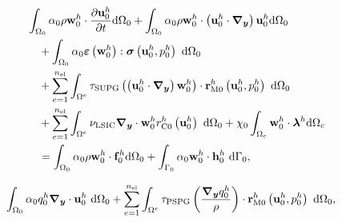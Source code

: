 \documentclass[tese_patricia]{subfiles}
\begin{document}
\begin{align}
	\begin{split}
		&\int_{\globalModel} \arlequinWFGlobal \density \wglobalh \cdot \frac{\partial\uglobalh}{\partial t} \deriv \globalModel +
		\int_{\globalModel} \arlequinWFGlobal \density \wglobalh \cdot  \left(\uglobalh \cdot \gradient \right) \uglobalh \deriv \globalModel  \\ 
		&\quad+	
		\int_{\globalModel} \arlequinWFGlobal \straintensor \left(\wglobalh\right) : \stresstensor \left(\uglobalh,\pglobalh\right)\ \deriv \globalModel \\
		&\quad+ \sum_{e=1}^{\nel} \int_{\domainE} \SUPG  \left(\left(\uglobalh \cdot \gradient \right) \wglobalh\right) \cdot \resMomGlobal\left(\uglobalh,\pglobalh \right)\  \deriv \globalModel \\ 
		&\quad+\sum_{e=1}^{\nel} \int_{\domainE} \LSIC \divergence \cdot \wglobalh \resPreGlobal 
		 \left(\uglobalh\right)\  \deriv \globalModel 
		 + \chi_{0} \int_{\gluingZone} \wglobalh \cdot \lagrangeMultiplierh \deriv \gluingZone   \\ 
		 &\quad = \int_{\globalModel} \arlequinWFGlobal \density \wglobalh \cdot  \globalsbodyforceh \deriv \globalModel + \int_{\globalBoundary} \arlequinWFGlobal \wglobalh  \cdot \globalSurfaceLoadh\ \deriv \globalBoundary,
		\label{eq:QM_forma_fraca_0}
	\end{split}
\end{align}


\begin{align}
	\begin{split}
		&	\int_{\Omega_0} \alpha_0 q_0^h \boldsymbol{\nabla_y} \cdot \mathbf{u}_0^h \ \mathrm{d} \Omega_0 +
\sum_{e=1}^{n_{\mathrm{el}}} \int_{\Omega^e} \tau_{\mathrm{PSPG}} \left(\frac{\boldsymbol{\nabla_y} q_0^h}{\rho}\right) \cdot \mathbf{r}_{\mathrm{M0}}^{h}\left(\mathbf{u}_0^h,p_0^h\right) \  \mathrm{d} \Omega_0,
		\label{eq:C_forma_fraca_0}
	\end{split}
\end{align}
\end{document}
